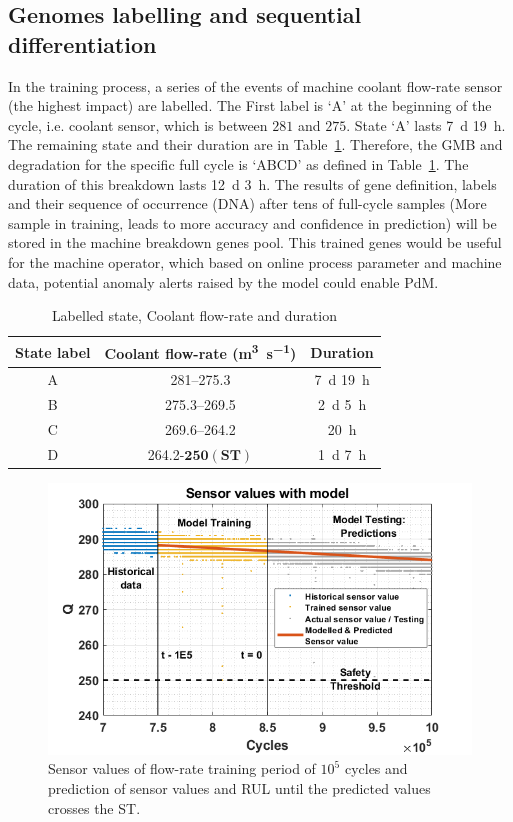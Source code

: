 \documentclass[conference]{IEEEtran}
\begin{document}
\subsection{Genomes labelling and sequential differentiation }
\label{subsec:Genome_labelling}
In the training process, a series of the events of machine coolant flow-rate sensor (the highest impact) are labelled. The First label is `A' at the beginning of the cycle, i.e. coolant sensor, which is between $281$ and $275$. State `A' lasts \SI{7}{\day} \SI{19}{\hour}. The remaining state and their duration are in Table~\ref{tab:II}.
Therefore, the GMB and degradation for the specific full cycle is `ABCD' as defined in Table~\ref{tab:II}. The duration of this breakdown lasts \SI{12}{\day} \SI{3}{\hour}. The results of gene definition, labels and their sequence of occurrence (DNA) after tens of full-cycle samples (More sample in training, leads to more accuracy and confidence in prediction) will be stored in the machine breakdown genes pool. This trained genes would be useful for the machine operator, which based on online process parameter and machine data, potential anomaly alerts raised by the model could enable PdM.
\begin{table}[t]
    \caption{Labelled state, Coolant flow-rate and duration}
    \begin{center}
        \begin{tabular}{|c|c|c|}
            \hline
            \textbf{State label}& \textbf{Coolant flow-rate (\si{\cubic\metre\per\second})}  & \textbf{Duration} \\
            \hline
            A & \numrange[range-phrase = -]{281}{275.3} & \SI{7}{\day} \SI{19}{\hour}  \\
            \hline
            B & \numrange[range-phrase = -]{275.3}{269.5} & \SI{2}{\day} \SI{5}{\hour} \\
            \hline
            C & \numrange[range-phrase = -]{269.6}{264.2} & \SI{20}{\hour} \\
            \hline
            D & \num{264.2}-\underline{$\mathbf{250 (ST)}$} & \SI{1}{\day} \SI{7}{\hour} \\
            \hline
        \end{tabular}
        \label{tab:II}
    \end{center}
\end{table}
\begin{figure}[b]
\centerline{\includegraphics[width=0.7\linewidth]{Model.png}}
\caption{Sensor values of flow-rate training period of $10^5$ cycles and prediction of sensor values and RUL until the predicted values crosses the ST.}
\label{fig:Model}
\end{figure}
\end{document}
